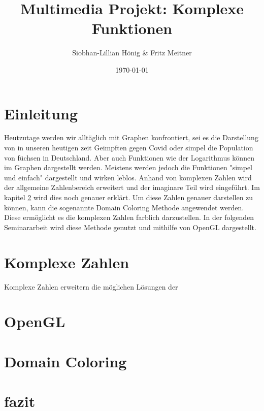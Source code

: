 \documentclass[11pt]{article}
\title{\textbf{Multimedia Projekt: Komplexe Funktionen}}
\author{Siobhan-Lillian Hönig & Fritz Meitner}
\date{\today}
\begin{document}
    
\begin{titlepage}
\maketitle
\end{titlepage}

\pagebreak
\section{Einleitung}
Heutzutage werden wir alltäglich mit Graphen konfrontiert, sei es die Darstellung von in unseren heutigen zeit Geimpften gegen Covid oder simpel die Population von füchsen in Deutschland. Aber auch Funktionen wie der Logarithmus können im Graphen dargestellt werden.
Meistens werden jedoch die Funktionen "simpel und einfach" dargestellt und wirken leblos. Anhand von komplexen Zahlen wird der allgemeine Zahlenbereich erweitert und der imaginare Teil wird eingeführt. Im kapitel \ref{Com} wird dies noch genauer erklärt. 
Um diese Zahlen genauer darstellen zu können, kann die sogenannte Domain Coloring Methode angewendet werden. Diese ermöglicht es die komplexen Zahlen farblich darzustellen. In der folgenden Seminararbeit wird diese Methode genutzt und mithilfe von OpenGL dargestellt.


\section{Komplexe Zahlen} \label{Com}
Komplexe Zahlen erweitern die möglichen Lösungen der 
\section{OpenGL}

\section{Domain Coloring}

\section{fazit}


\pagebreak
\tableofcontents
\pagebreak





\end{document}
